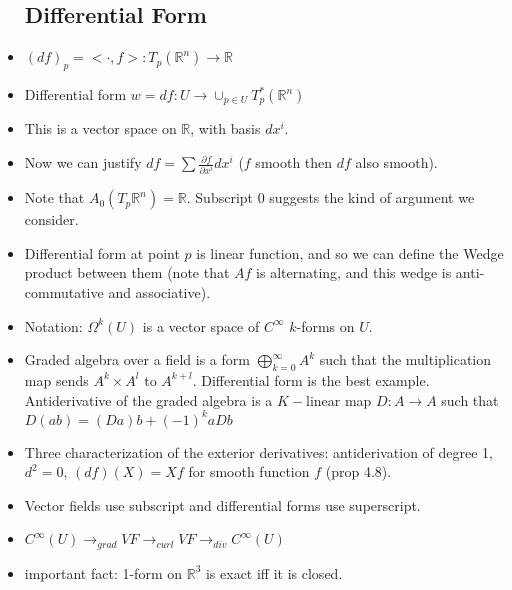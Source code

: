 \documentclass{article}
\theoremstyle{remark}
\begin{document}
\begin{itemize}
\subsection*{Differential Form}
\item $(df)_p=<\cdot, f>:T_p(\mathbb{R}^n)\to \mathbb{R}$
\item Differential form $w=df:U\to\cup_{p\in U}T^* _p (\mathbb{R}^n)$
\item This is a vector space on $\mathbb{R}$, with basis $dx^i$.
\item Now we can justify $df=\sum\frac{\partial f}{\partial x^i}dx^i$ ($f$ smooth then $df$ also smooth).
\item Note that $A_0(T_p\mathbb{R}^n)=\mathbb{R}$. Subscript $0$ suggests the kind of argument we consider.
\item Differential form at point $p$ is linear function, and so we can define the Wedge product between them (note that $Af$ is alternating, and this wedge is anti-commutative and associative).
\item Notation: $\Omega^k (U)$ is a vector space of $C^\infty$ $k$-forms on $U$.
\item Graded algebra over a field is a form $\bigoplus_{k=0}^\infty A^k$ such that the multiplication map sends $A^k\times A^l$ to $A^{k+l}$. Differential form is the best example. Antiderivative of the graded algebra is a $K-$linear map $D:A\to A$ such that $D(ab)=(Da)b+(-1)^k aDb$
\item Three characterization of the exterior derivatives: antiderivation of degree 1, $d^2=0$, $(df)(X)=Xf$ for smooth function $f$ (prop 4.8).
\item Vector fields use subscript and differential forms use superscript.
\item $C^\infty (U)\to_{grad} VF \to_{curl} VF \to_{div} C^\infty (U)$
\item important fact: 1-form on $\mathbb{R}^3$ is exact iff it is closed.
\end{itemize}
\end{document}
